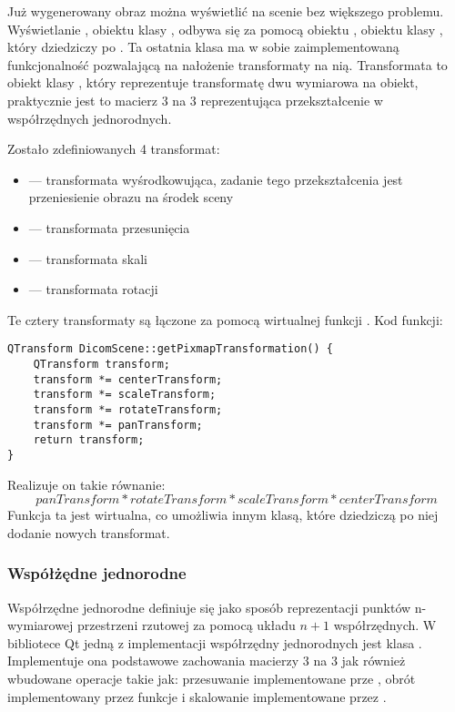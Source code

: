\label{sec:sokar-dicomscene-tranformat}

\par
Już wygenerowany obraz można wyświetlić na scenie bez większego problemu.
Wyświetlanie , obiektu klasy , odbywa się za pomocą obiektu , obiektu klasy , który dziedziczy po .
Ta ostatnia klasa ma w sobie zaimplementowaną funkcjonalność pozwalającą na nałożenie transformaty na nią.
Transformata to obiekt klasy , który reprezentuje transformatę dwu wymiarowa na obiekt, praktycznie jest to macierz 3 na 3 reprezentująca przekształcenie w współrzędnych jednorodnych.
\par

Zostało zdefiniowanych 4 transformat:
\begin{itemize}
    \item {} --- transformata wyśrodkowująca, zadanie tego przekształcenia jest przeniesienie obrazu na środek sceny
    \item {} --- transformata przesunięcia
    \item {} --- transformata skali
    \item {} --- transformata rotacji
\end{itemize}

Te cztery transformaty są łączone za pomocą wirtualnej funkcji .
Kod funkcji:
\begin{lstlisting}
QTransform DicomScene::getPixmapTransformation() {
	QTransform transform;
	transform *= centerTransform;
	transform *= scaleTransform;
	transform *= rotateTransform;
	transform *= panTransform;
	return transform;
}
\end{lstlisting}
Realizuje on takie równanie:
\[panTransform*rotateTransform*scaleTransform*centerTransform\]
Funkcja ta jest wirtualna, co umożliwia innym klasą, które dziedziczą po niej dodanie nowych transformat.

\subsubsection{Współżędne jednorodne}

Współrzędne jednorodne definiuje się jako sposób reprezentacji punktów n-wymiarowej przestrzeni rzutowej za pomocą układu $n+1$ współrzędnych.
W bibliotece Qt jedną z implementacji współrzędny jednorodnych jest klasa .
Implementuje ona podstawowe zachowania macierzy 3 na 3 jak również wbudowane operacje takie jak: przesuwanie implementowane prze , obrót implementowany przez funkcje  i skalowanie implementowane przez .

